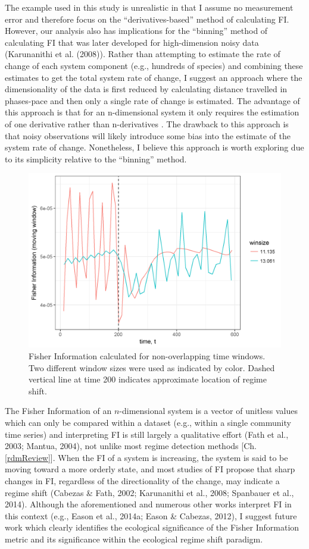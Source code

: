 \documentclass[12pt,twoside,openany]{reedthesis}
\begin{document}
The example used in this study is unrealistic in that I assume no measurement error and therefore focus on the ``derivatives-based'' method of calculating FI. However, our analysis also has implications for the ``binning'' method of calculating FI that was later developed for high-dimension noisy data (Karunanithi et al. (2008)). Rather than attempting to estimate the rate of change of each system component (e.g., hundreds of species) and combining these estimates to get the total system rate of change, I suggest an approach where the dimensionality of the data is first reduced by calculating distance travelled in phases-pace and then only a single rate of change is estimated. The advantage of this approach is that for an n-dimensional system it only requires the estimation of one derivative rather than n-derivatives . The drawback to this approach is that noisy observations will likely introduce some bias into the estimate of the system rate of change. Nonetheless, I believe this approach is worth exploring due to its simplicity relative to the ``binning'' method.
\begin{figure}
\includegraphics[width=0.85\linewidth]{./chapterFiles/fiGuide/figures/fiOverTime} \caption{Fisher Information calculated for non-overlapping time windows. Two different window sizes were used as indicated by color. Dashed vertical line at time 200 indicates approximate location of regime shift.}\label{fig:fiOverTime}
\end{figure}
The Fisher Information of an \(n\)-dimensional system is a vector of unitless values which can only be compared within a dataset (e.g., within a single community time series) and interpreting FI is still largely a qualitative effort (Fath et al., 2003; Mantua, 2004), not unlike most regime detection methods {[}Ch. \ref{rdmReview}{]}. When the FI of a system is increasing, the system is said to be moving toward a more orderly state, and most studies of FI propose that sharp changes in FI, regardless of the directionality of the change, may indicate a regime shift (Cabezas \& Fath, 2002; Karunanithi et al., 2008; Spanbauer et al., 2014). Although the aforementioned and numerous other works interpret FI in this context (e.g., Eason et al., 2014a; Eason \& Cabezas, 2012), I suggest future work which clearly identifies the ecological significance of the Fisher Information metric and its significance within the ecological regime shift paradigm.
\end{document}
